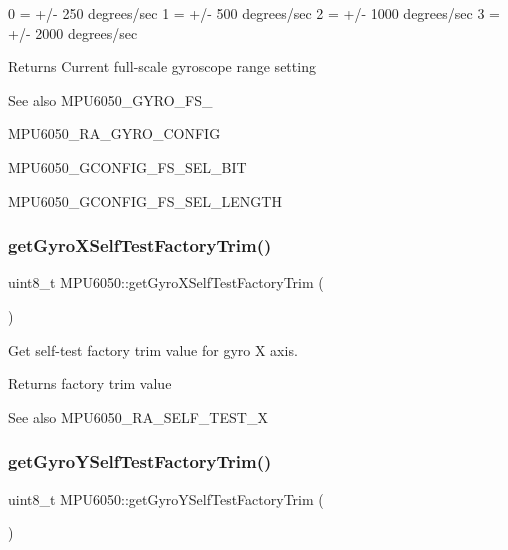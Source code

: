 \begin{DoxyPre}
0 = +/- 250 degrees/sec
1 = +/- 500 degrees/sec
2 = +/- 1000 degrees/sec
3 = +/- 2000 degrees/sec
\end{DoxyPre}


\begin{DoxyReturn}{Returns}
Current full-\/scale gyroscope range setting 
\end{DoxyReturn}
\begin{DoxySeeAlso}{See also}
M\+P\+U6050\+\_\+\+G\+Y\+R\+O\+\_\+\+F\+S\+\_ 

M\+P\+U6050\+\_\+\+R\+A\+\_\+\+G\+Y\+R\+O\+\_\+\+C\+O\+N\+F\+IG 

M\+P\+U6050\+\_\+\+G\+C\+O\+N\+F\+I\+G\+\_\+\+F\+S\+\_\+\+S\+E\+L\+\_\+\+B\+IT 

M\+P\+U6050\+\_\+\+G\+C\+O\+N\+F\+I\+G\+\_\+\+F\+S\+\_\+\+S\+E\+L\+\_\+\+L\+E\+N\+G\+TH 
\end{DoxySeeAlso}
\mbox{\label{class_m_p_u6050_a9e50a2644c5ac8c9ac4270c86fd18a93}} 
\subsubsection{\texorpdfstring{getGyroXSelfTestFactoryTrim()}{getGyroXSelfTestFactoryTrim()}}
{\footnotesize\ttfamily uint8\+\_\+t M\+P\+U6050\+::get\+Gyro\+X\+Self\+Test\+Factory\+Trim (\begin{DoxyParamCaption}{ }\end{DoxyParamCaption})}

Get self-\/test factory trim value for gyro X axis. \begin{DoxyReturn}{Returns}
factory trim value 
\end{DoxyReturn}
\begin{DoxySeeAlso}{See also}
M\+P\+U6050\+\_\+\+R\+A\+\_\+\+S\+E\+L\+F\+\_\+\+T\+E\+S\+T\+\_\+X 
\end{DoxySeeAlso}
\mbox{\label{class_m_p_u6050_ae3e0610d6d3bb8162c4d5c99e0f53106}} 
\subsubsection{\texorpdfstring{getGyroYSelfTestFactoryTrim()}{getGyroYSelfTestFactoryTrim()}}
{\footnotesize\ttfamily uint8\+\_\+t M\+P\+U6050\+::get\+Gyro\+Y\+Self\+Test\+Factory\+Trim (\begin{DoxyParamCaption}{ }\end{DoxyParamCaption})}


